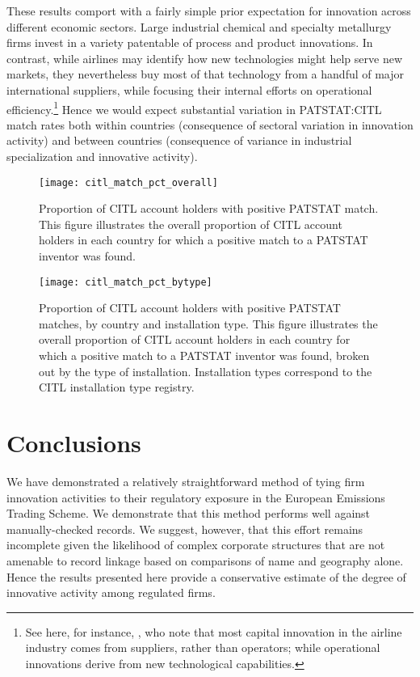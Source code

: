 \documentclass[11pt]{article}
\begin{document}
These results comport with a fairly simple prior expectation
for innovation across different economic sectors. Large industrial
chemical and specialty metallurgy firms invest in a variety patentable of process
and product innovations. In contrast, while airlines may identify how
new technologies might help serve new markets, they nevertheless buy
most of that technology from a handful of major international suppliers,
while focusing their internal efforts on operational efficiency.\footnote{See here, for instance,
  \cite{brueckner2009technological}, who note that most capital
  innovation in the airline industry comes from suppliers, rather than
  operators; while operational innovations derive from new technological
  capabilities.} Hence we would expect substantial variation in
PATSTAT:CITL match rates both within countries (consequence of sectoral variation
in innovation activity) and between countries (consequence of variance
in industrial specialization and innovative activity). 

\begin{figure}[ht]
  \centering
  \texttt{[image: citl\_match\_pct\_overall]}
  \caption{Proportion of CITL account holders with positive PATSTAT match. This figure illustrates the overall proportion of CITL account holders in each country for which a positive match to a PATSTAT inventor was found.}
  \label{fig:citl-match-pct}
\end{figure}

\begin{figure}[ht]
  \centering
  \texttt{[image: citl\_match\_pct\_bytype]}
  \caption{Proportion of CITL account holders with positive PATSTAT matches, by country and installation type. This figure illustrates the overall proportion of CITL account holders in each country for which a positive match to a PATSTAT inventor was found, broken out by the type of installation. Installation types correspond to the CITL installation type registry.}
  \label{fig:citl-match-pct-bytype}
\end{figure}



\section{Conclusions}
\label{sec:conclusions}

We have demonstrated a relatively straightforward method of tying firm
innovation activities to their regulatory exposure in the European
Emissions Trading Scheme. We demonstrate that this method performs
well against manually-checked records. We suggest, however, that this
effort remains incomplete given the likelihood of complex corporate
structures that are not amenable to record linkage based on
comparisons of name and geography alone. Hence the results presented
here provide a conservative estimate of the degree of innovative
activity among regulated firms. 



\end{document}
